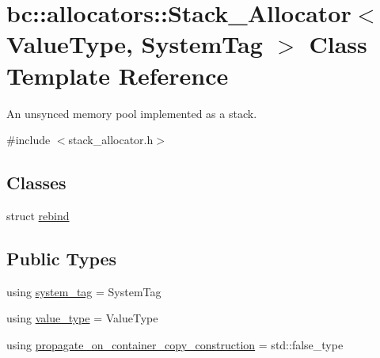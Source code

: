 \hypertarget{classbc_1_1allocators_1_1Stack__Allocator}{}\section{bc\+:\+:allocators\+:\+:Stack\+\_\+\+Allocator$<$ Value\+Type, System\+Tag $>$ Class Template Reference}
\label{classbc_1_1allocators_1_1Stack__Allocator}


An unsynced memory pool implemented as a stack.  




{\ttfamily \#include $<$stack\+\_\+allocator.\+h$>$}

\subsection*{Classes}
\begin{DoxyCompactItemize}
\item 
struct \hyperlink{structbc_1_1allocators_1_1Stack__Allocator_1_1rebind}{rebind}
\end{DoxyCompactItemize}
\subsection*{Public Types}
\begin{DoxyCompactItemize}
\item 
using \hyperlink{classbc_1_1allocators_1_1Stack__Allocator_ad3a23f4b9643e115001b9e1beed650a0}{system\+\_\+tag} = System\+Tag
\item 
using \hyperlink{classbc_1_1allocators_1_1Stack__Allocator_a67c90d1cfb44c86aad7aebddc3401b7e}{value\+\_\+type} = Value\+Type
\item 
using \hyperlink{classbc_1_1allocators_1_1Stack__Allocator_a0ee5d61459babc228fbb10b3a88c8973}{propagate\+\_\+on\+\_\+container\+\_\+copy\+\_\+construction} = std\+::false\+\_\+type
\end{DoxyCompactItemize}
